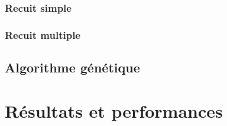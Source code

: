\documentclass[11pt,french]{report}
\begin{document}
	\subsubsection{Recuit simple}
	
	\subsubsection{Recuit multiple}
	
	\subsection{Algorithme génétique}
	
	\section{Résultats et performances}
\end{document}
